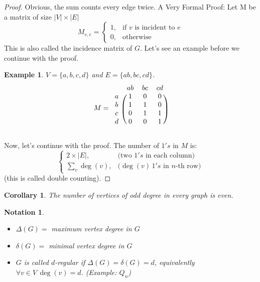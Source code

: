 \documentclass[a4paper]{article}
\theoremstyle{plain}
\newtheorem{corollary}[lemma]{Corollary}
\newtheorem{notation}[lemma]{Notation}
\theoremstyle{myremark}
\newtheorem{example}[lemma]{Example}
\begin{document}
\begin{proof}
Obvious, the sum counts every edge twice.\newline
A Very Formal Proof: Let M be a matrix of size $|V|\times |E|$
\[
    M_{v,e}= 
\begin{cases}
    1,  & \text{if $v$ is incident to $e$}\\
    0,  & \text{otherwise}
\end{cases}
\]
This is also called the incidence matrix of $G$. Let's see an example before we continue with the proof.

\begin{example}
$V=\{a,b,c,d\}$ and $E=\{ab,bc,cd\}$.
\[
M=
\begin{blockarray}{cccc}
 & ab & bc & cd \\
\begin{block}{c(ccc)}
  a & 1 & 0 & 0\\
  b & 1 & 1 & 0\\
  c & 0 & 1 & 1\\
  d & 0 & 0 & 1\\
\end{block}
\end{blockarray}
 \]
\end{example}
\noindent Now, let's continue with the proof.\newline 
The number of $1's$ in $M$ is:
\[
\begin{cases}
    2\times |E|,  & \text{(two $1's$ in each column)}\\
    \sum_{v}^{} \deg(v),  & \text{($\deg(v)\, 1's$ in $n$-th row)}
\end{cases}
\]
(this is called double counting).
\end{proof}

\begin{corollary}
The number of vertices of odd degree in every graph is even.
\end{corollary}

\begin{notation}
 $\,$
    \begin{itemize}
        \item $\Delta (G)=$ maximum vertex degree in $G$
        \item $\delta (G)=$ minimal vertex degree in $G$
        \item $G$ is called $d$-regular if $\Delta(G)=\delta(G)=d$, equivalently $\forall v\in V\, \deg(v)=d$. (Example: $Q_n$)
    \end{itemize}
\end{notation}
\end{document}
